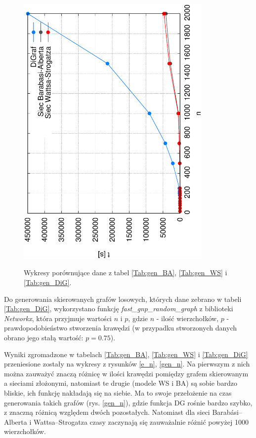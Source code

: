 \documentclass[a4paper, 12pt, twoside, openright]{article}
\begin{document}
\begin{figure}[H]
{		\includegraphics[angle=270,width=0.85\textwidth]{img/wyniki/gen_n}}
	\caption[]{Wykresy porównujące dane z tabel \ref{Tab:gen_BA}, \ref{Tab:gen_WS} i \ref{Tab:gen_DiG}.}
	\label{gen}
\end{figure}


Do generowania skierowanych grafów losowych, których dane zebrano w tabeli \ref{Tab:gen_DiG}, wykorzystano funkcję \textit{fast\_gnp\_random\_graph} z biblioteki \textit{Networkx}, która przyjmuje wartości $n$ i $p$, gdzie $n$ - ilość wierzchołków, $p$ - prawdopodobieństwo stworzenia krawędzi (w przypadku stworzonych danych obrano jego stałą wartość: $p= 0.75$).


Wyniki zgromadzone w tabelach \ref{Tab:gen_BA}, \ref{Tab:gen_WS} i \ref{Tab:gen_DiG} przeniesione zostały na wykresy z rysunków \ref{e_n}, \ref{gen_n}. Na pierwszym z nich można zauważyć znaczą różnicę w ilości krawędzi pomiędzy grafem skierowanym a sieciami złożonymi, natomiast te drugie (modele WS i BA) są sobie bardzo bliskie, ich funkcję nakładają się na siebie. Ma to swoje przełożenie na czas generowania takich grafów (rys. \ref{gen_n}), gdzie funkcja DG rośnie bardzo szybko, z znaczną różnicą względem dwóch pozostałych. Natomiast dla sieci Barabási–Alberta i Wattsa–Strogatza czasy zaczynają się zauważalnie różnić powyżej 1000 wierzchołków.
\end{document}
